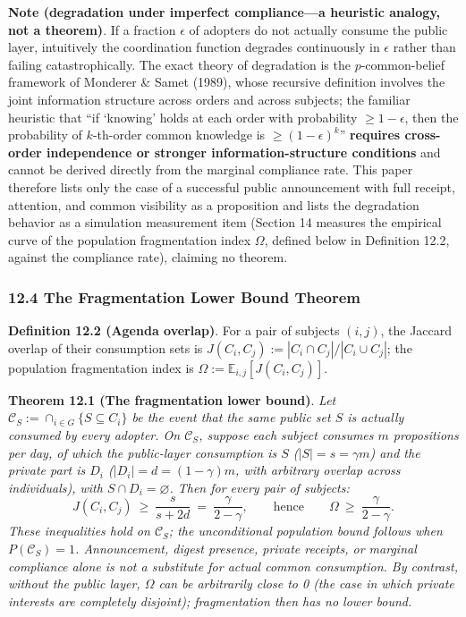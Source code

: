 \documentclass[
  11pt]{article}
\begin{document}
\textbf{Note (degradation under imperfect compliance---a heuristic
analogy, not a theorem)}. If a fraction \(\epsilon\) of adopters do not
actually consume the public layer, intuitively the coordination function
degrades continuously in \(\epsilon\) rather than failing
catastrophically. The exact theory of degradation is the
\(p\)-common-belief framework of Monderer \& Samet (1989), whose
recursive definition involves the joint information structure across
orders and across subjects; the familiar heuristic that ``if `knowing'
holds at each order with probability \(\ge 1-\epsilon\), then the
probability of \(k\)-th-order common knowledge is
\(\ge (1-\epsilon)^k\)'' \textbf{requires cross-order independence or
stronger information-structure conditions} and cannot be derived
directly from the marginal compliance rate. This paper therefore lists
only the case of a successful public announcement with full receipt,
attention, and common visibility as a proposition and lists the
degradation behavior as a simulation measurement item (Section 14
measures the empirical curve of the population fragmentation index
\(\Omega\), defined below in Definition 12.2, against the compliance
rate), claiming no theorem.

\subsubsection{12.4 The Fragmentation Lower Bound
Theorem}\label{the-fragmentation-lower-bound-theorem}

\textbf{Definition 12.2 (Agenda overlap)}. For a pair of subjects
\((i,j)\), the Jaccard overlap of their consumption sets is
\(J(C_i, C_j) := |C_i \cap C_j| / |C_i \cup C_j|\); the population
fragmentation index is \(\Omega := \mathbb{E}_{i,j}[J(C_i, C_j)]\).

\textbf{Theorem 12.1 (The fragmentation lower bound)}. \emph{Let
\(\mathcal C_S:=\cap_{i\in G}\{S\subseteq C_i\}\) be the event that the
same public set \(S\) is actually consumed by every adopter. On
\(\mathcal C_S\), suppose each subject consumes \(m\) propositions per
day, of which the public-layer consumption is \(S\)
(\(|S| = s = \gamma m\)) and the private part is \(D_i\)
(\(|D_i| = d = (1-\gamma)m\), with arbitrary overlap across
individuals), with \(S \cap D_i = \varnothing\). Then for every pair of
subjects:}
\[J(C_i, C_j)\ \ge\ \frac{s}{s + 2d}\ =\ \frac{\gamma}{2 - \gamma}, \qquad\text{hence}\qquad \Omega\ \ge\ \frac{\gamma}{2-\gamma}.\]
\emph{These inequalities hold on \(\mathcal C_S\); the unconditional
population bound follows when \(P(\mathcal C_S)=1\). Announcement,
digest presence, private receipts, or marginal compliance alone is not a
substitute for actual common consumption. By contrast, without the
public layer, \(\Omega\) can be arbitrarily close to 0 (the case in
which private interests are completely disjoint); fragmentation then has
no lower bound.}
\end{document}
